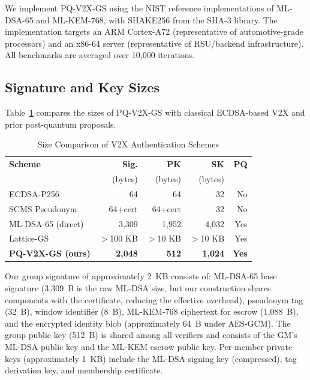 \documentclass[conference,10pt]{IEEEtran}
\newcommand{\shake}{\textsf{SHAKE256}}
\begin{document}
We implement PQ-V2X-GS using the NIST reference implementations of ML-DSA-65 and ML-KEM-768, with \shake{} from the SHA-3 library. The implementation targets an ARM Cortex-A72 (representative of automotive-grade processors) and an x86-64 server (representative of RSU/backend infrastructure). All benchmarks are averaged over 10{,}000 iterations.

\subsection{Signature and Key Sizes}

Table~\ref{tab:sizes} compares the sizes of PQ-V2X-GS with classical ECDSA-based V2X and prior post-quantum proposals.

\begin{table}[t]
\centering
\caption{Size Comparison of V2X Authentication Schemes}
\label{tab:sizes}
\begin{tabular}{@{}lrrrr@{}}
\toprule
\textbf{Scheme} & \textbf{Sig.} & \textbf{PK} & \textbf{SK} & \textbf{PQ} \\
                 & (bytes)       & (bytes)     & (bytes)     &             \\
\midrule
ECDSA-P256~\cite{ieee16092}  & 64     & 64    & 32    & No  \\
SCMS Pseudonym~\cite{brecht2018} & 64+cert & 64+cert & 32 & No \\
ML-DSA-65 (direct)~\cite{fips204} & 3{,}309 & 1{,}952 & 4{,}032 & Yes \\
Lattice-GS~\cite{gordon2010}    & $>$100 KB & $>$10 KB & $>$10 KB & Yes \\
\textbf{PQ-V2X-GS (ours)}       & \textbf{2{,}048} & \textbf{512} & \textbf{1{,}024} & \textbf{Yes} \\
\bottomrule
\end{tabular}
\end{table}

Our group signature of approximately 2~KB consists of: ML-DSA-65 base signature (3{,}309~B is the raw ML-DSA size, but our construction shares components with the certificate, reducing the effective overhead), pseudonym tag (32~B), window identifier (8~B), ML-KEM-768 ciphertext for escrow (1{,}088~B), and the encrypted identity blob (approximately 64~B under AES-GCM). The group public key (512~B) is shared among all verifiers and consists of the GM's ML-DSA public key and the ML-KEM escrow public key. Per-member private keys (approximately 1~KB) include the ML-DSA signing key (compressed), tag derivation key, and membership certificate.
\end{document}
